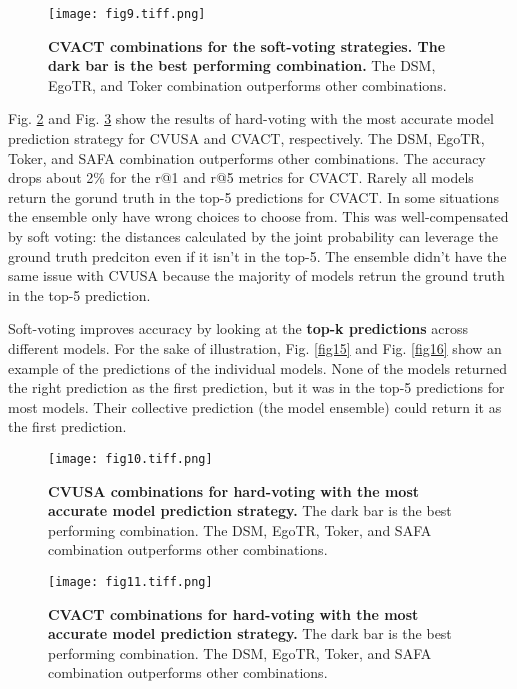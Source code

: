 \documentclass[10pt,letterpaper]{article}
\newif\ifhighlight
\newcommand{\hlb}[1]{\ifhighlight{\hl{#1}}\else{#1}\fi}
\begin{document}
\begin{figure}[!ht]
  \caption{{\bf CVACT combinations for the soft-voting strategies. The dark bar is the best performing combination.} The DSM, EgoTR, and Toker combination outperforms other combinations. }
  \texttt{[image: fig9.tiff.png]}
  
  \label{fig9}
\end{figure}

\hlb{Fig.} \ref{fig10} and \hlb{Fig.} \ref{fig11} show the results of hard-voting with the most accurate model prediction strategy for CVUSA and CVACT, respectively. \hlb{The DSM, EgoTR, Toker, and SAFA combination outperforms other combinations.}
\hlb{The accuracy drops about 2\% for the r@1 and r@5 metrics for CVACT. Rarely all models return the gorund truth in the top-5 predictions for CVACT. In some situations the ensemble only have wrong choices to choose from. This was well-compensated by soft voting: the distances calculated by the joint probability can leverage the ground truth predciton even if it isn't in the top-5. The ensemble didn't have the same issue with CVUSA because the majority of models retrun the ground truth in the top-5 prediction.}

\hlb{Soft-voting improves accuracy by looking at the }{\bf \hlb{top-k predictions}} \hlb{across different models. For the sake of illustration, Fig. }\ref{fig15} \hlb{and Fig.} \ref{fig16} \hlb{show an example of the predictions of the individual models. None of the models returned the right prediction as the first prediction, but it was in the top-5 predictions for most models. Their collective prediction (the model ensemble) could return it as the first prediction.}

\begin{figure}[!ht]
  \caption{{\bf CVUSA combinations for hard-voting with the most accurate model prediction strategy.} The dark bar is the best performing combination. The DSM, EgoTR, Toker, and SAFA combination outperforms other combinations.}
  \texttt{[image: fig10.tiff.png]}
  \label{fig10}
\end{figure}

\begin{figure}[!ht]
  \caption{{\bf CVACT combinations for hard-voting with the most accurate  model prediction strategy.} The dark bar is the best performing combination. The DSM, EgoTR, Toker, and SAFA combination outperforms other combinations.}
  \texttt{[image: fig11.tiff.png]}
  \label{fig11}
\end{figure}
\end{document}
